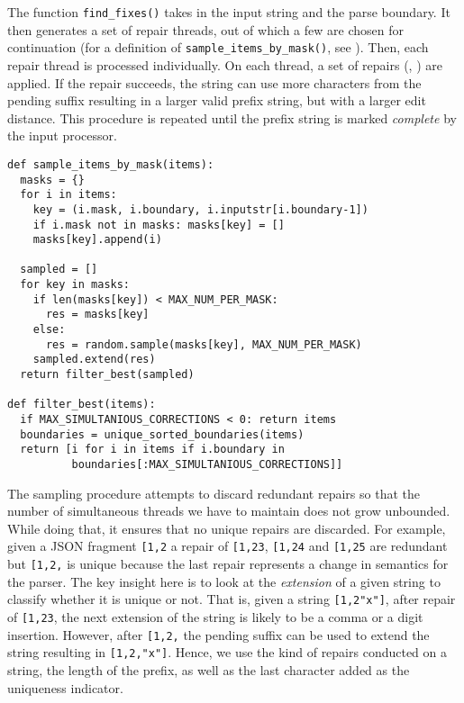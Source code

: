 \documentclass[acmsmall,screen,review,anonymous]{acmart}
\def\<#1>{\texttt{#1}}
\begin{document}
The function \<find\_fixes()> takes in the input string and the parse boundary.
It then generates a set of repair threads, out of which a few are chosen for
continuation (for a definition of \lstinline|sample_items_by_mask()|, see ).
Then, each repair thread is processed individually.
On each thread, a set of repairs (, )
are applied. If the repair succeeds,
the string can use more characters from the pending suffix resulting in a
larger valid prefix string, but with a larger edit distance. This procedure is
repeated until the prefix string is marked \emph{complete} by the input
processor.

\begin{lstlisting}[caption=Code that shows the sampling process,label={lst:sampling}]
def sample_items_by_mask(items):
  masks = {}
  for i in items:
    key = (i.mask, i.boundary, i.inputstr[i.boundary-1])
    if i.mask not in masks: masks[key] = []
    masks[key].append(i)

  sampled = []
  for key in masks:
    if len(masks[key]) < MAX_NUM_PER_MASK:
      res = masks[key]
    else:
      res = random.sample(masks[key], MAX_NUM_PER_MASK)
    sampled.extend(res)
  return filter_best(sampled)

def filter_best(items):
  if MAX_SIMULTANIOUS_CORRECTIONS < 0: return items
  boundaries = unique_sorted_boundaries(items)
  return [i for i in items if i.boundary in
          boundaries[:MAX_SIMULTANIOUS_CORRECTIONS]]
\end{lstlisting}
\vspace{\baselineskip}


The sampling procedure attempts to discard redundant repairs so that the number
of simultaneous threads we have to maintain does not grow unbounded. While doing
that, it ensures that no unique repairs are discarded. For
example, given a JSON fragment \<[1,2> a repair of \<[1,23>, \<[1,24>
and \<[1,25> are redundant but \<[1,2,> is unique because the last repair
represents a change in semantics for the parser. The key insight here is to
look at the \emph{extension} of a given string to classify whether it is unique
or not. That is, given a string \<[1,2"x"]>, after repair of \<[1,23>, the next
extension of the string is likely to be a comma or a digit insertion. However,
after \<[1,2,> the pending suffix can be used to extend the string resulting in
\<[1,2,"x"]>.
    Hence, we use the kind of repairs conducted on a string, the
length of the prefix, as well as the last character added as the
uniqueness indicator.
\end{document}
